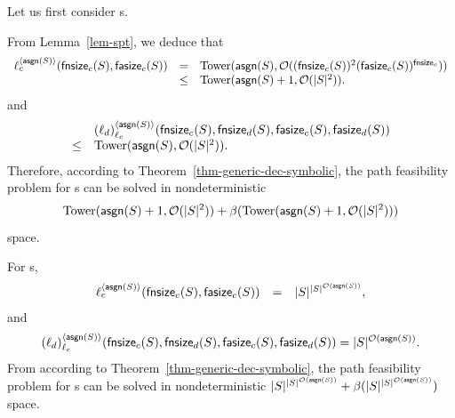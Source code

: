 Let us first consider \SSPT{}s.

From Lemma~\ref{lem-spt}, we deduce that 
$$
\begin{array}{l c l}
\ell_c^{\langle \mathsf{asgn}(S) \rangle}(\mathsf{fnsize}_c(S), \mathsf{fasize}_c(S)) &=& \mathrm{Tower}(\mathsf{asgn}(S), \mathcal{O}((\mathsf{fnsize}_c(S))^2 (\mathsf{fasize}_c(S))^{\mathsf{fnsize}_c})) \\
& \le &  \mathrm{Tower}(\mathsf{asgn}(S)+1, \mathcal{O}(|S|^2)).
\end{array}
$$
and
$$
\begin{array}{l l}
& (\ell_d)^{\langle \mathsf{asgn}(S) \rangle}_{\ell_c}(\mathsf{fnsize}_c(S), \mathsf{fnsize}_d(S), \mathsf{fasize}_c(S), \mathsf{fasize}_d(S)) \\
\le &  \mathrm{Tower}(\mathsf{asgn}(S), \mathcal{O}(|S|^2)).
\end{array}
$$
Therefore, according to Theorem~\ref{thm-generic-dec-symbolic},  the path feasibility problem for \SSPT{}s can be solved in nondeterministic 
$$\mathrm{Tower}(\mathsf{asgn}(S)+1, \mathcal{O}(|S|^2)) + \beta(\mathrm{Tower}(\mathsf{asgn}(S)+1, \mathcal{O}(|S|^2)))$$
 space.
 
 For \SPT{}s, 
 $$
\begin{array}{l c l}
\ell_c^{\langle \mathsf{asgn}(S) \rangle}(\mathsf{fnsize}_c(S), \mathsf{fasize}_c(S)) &=& |S|^{|S|^{\mathcal{O}(\mathsf{asgn}(S))}},
\end{array}
$$
and
$$
(\ell_d)^{\langle \mathsf{asgn}(S) \rangle}_{\ell_c}(\mathsf{fnsize}_c(S), \mathsf{fnsize}_d(S), \mathsf{fasize}_c(S), \mathsf{fasize}_d(S)) = |S|^{\mathcal{O}(\mathsf{asgn}(S))}.
$$
From according to Theorem~\ref{thm-generic-dec-symbolic}, the path feasibility problem for \SPT{}s can be solved in nondeterministic 
$|S|^{|S|^{\mathcal{O}(\mathsf{asgn}(S))}} + \beta(|S|^{|S|^{\mathcal{O}(\mathsf{asgn}(S))}})$
space.
